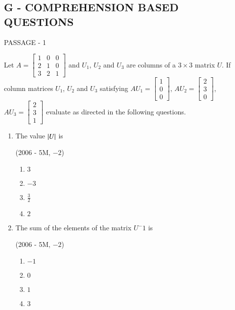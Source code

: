 \documentclass[journal,12pt,twocolumn]{IEEEtran}
\theoremstyle{remark}
\begin{document}
\bigskip

\begin{multicols}{2}

	\section*{G - COMPREHENSION BASED QUESTIONS}

	\bigskip

	{\centering PASSAGE - 1 \par}

	\bigskip	

	Let $A = \begin{bmatrix}
		1 & 0 & 0 \\
		2 & 1 & 0 \\
	3 & 2 & 1 \end{bmatrix}$ and $U_1$, $U_2$ and $U_3$ are columns of a $3\times3$ matrix $U$. If column matrices $U_1$, $U_2$ and $U_3$ satisfying 
	$AU_1 = \begin{bmatrix}
		1 \\
		0 \\
		0 \end{bmatrix}$,
	$AU_2 = \begin{bmatrix}
		2 \\
		3 \\
		0 \end{bmatrix}$,
	$AU_3 = \begin{bmatrix}
		2 \\
		3 \\
		1 \end{bmatrix}$ evaluate as directed in the following questions.

	\begin{enumerate}
		\item The value $\left\vert U\right\vert$ is

			\hfill(2006 - 5M, $-2$)

			\begin{enumerate}
				\item $3$
				\item $-3$
			\item $\frac{3}{2}$
				\item $2$
			\end{enumerate}

		\item The sum of the elements of the matrix $U^-1$ is

			\hfill(2006 - 5M, $-2$)

			\begin{enumerate}
				\item $-1$
				\item $0$
				\item $1$
				\item $3$
			\end{enumerate}


\end{enumerate}
\end{multicols}
\end{document}
